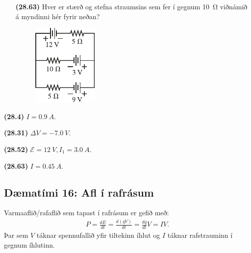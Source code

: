 \ifdefined \wholebook \else\documentclass[oneside]{book}\usepackage{EdlBook}\graphicspath{{figures/}}
\begin{document}
\begin{enumerate}[label = \textbf{(\alph*)}]
\item[\textbf{(28.63)}] Hver er stærð og stefna straumsins sem fer í gegnum \SI{10}{\ohm} viðnámið á myndinni hér fyrir neðan?

\begin{figure}[H]
    \centering
    \includegraphics[scale = 1.2]{figures/rk2863.pdf}
\end{figure}

\end{enumerate}

\begin{tcolorbox}
\begin{enumerate*}[label = ]
  \item \textbf{(28.4)} $I = \SI{0.9}{A}$.
  \item \textbf{(28.31)} $\Delta V = -\SI{7.0}{V}$.
  \item \textbf{(28.52)} $\mathcal{E} = \SI{12}{V}, I_1 = \SI{3.0}{A}$.
  \item \textbf{(28.63)} $I = \SI{0.45}{A}$.
\end{enumerate*}
\end{tcolorbox}

\newpage

\subsection*{Dæmatími 16: Afl í rafrásum}

\begin{tcolorbox}
Varmaaflið/rafaflið sem tapast í rafrásum er gefið með:
\begin{align*}
    P = \frac{dE}{dt} = \frac{d\left(qV \right)}{dt} = \frac{dq}{dt}V = IV.
\end{align*}
Þar sem $V$ táknar spennufallið yfir tiltekinn íhlut og $I$ táknar rafstrauminn í gegnum íhlutinn.
\end{tcolorbox}
\end{document}
